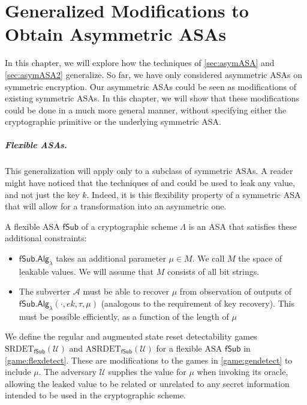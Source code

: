 \chapter{Generalized Modifications to Obtain Asymmetric ASAs} \label{sec:generalize}
In this chapter, we will explore how the techniques of \autoref{sec:asymASA} and \autoref{sec:asymASA2} generalize. So far, we have only considered asymmetric ASAs on symmetric encryption. Our asymmetric ASAs could be seen as modifications of existing symmetric ASAs. In this chapter, we will show that these modifications could be done in a much more general manner, without specifying either the cryptographic primitive or the underlying symmetric ASA.

\paragraph{Flexible ASAs.} This generalization will apply only to a subclass of symmetric ASAs. A reader might have noticed that the techniques of \cite{C:BelPatRog14} and \cite{CCS:BelJaeKan15} could be used to leak any value, and not just the key $k$. Indeed, it is this flexibility property of a symmetric ASA that will allow for a transformation into an asymmetric one.

A flexible ASA $\mathsf{fSub}$ of a cryptographic scheme $\mathsf{\Lambda}$ is an ASA that satisfies these additional constraints:
\begin{itemize}\itemsep0em
\item $\mathsf{fSub.Alg}_\lambda$ takes an additional parameter $\mu\in M$. We call $M$ the space of leakable values. We will assume that $M$ consists of all bit strings.
\item The subverter $\mathcal{A}$ must be able to recover $\mu$ from observation of outputs of $\mathsf{fSub.Alg}_\lambda(\cdot,\allowbreak{}ek,\tau,\mu)$ (analogous to the requirement of key recovery). This must be possible efficiently, as a function of the length of $\mu$
\end{itemize}

We define the regular and augmented state reset detectability games $\mathrm{SRDET}_\mathsf{fSub}(\mathcal{U})$ and $\mathrm{ASRDET}_\mathsf{fSub}(\mathcal{U})$ for a flexible ASA $\mathsf{fSub}$ in \autoref{game:flexdetect}. These are modifications to the games in \autoref{game:gendetect} to include $\mu$. The adversary $\mathcal{U}$ supplies the value for $\mu$ when invoking its oracle, allowing the leaked value to be related or unrelated to any secret information intended to be used in the cryptographic scheme.

